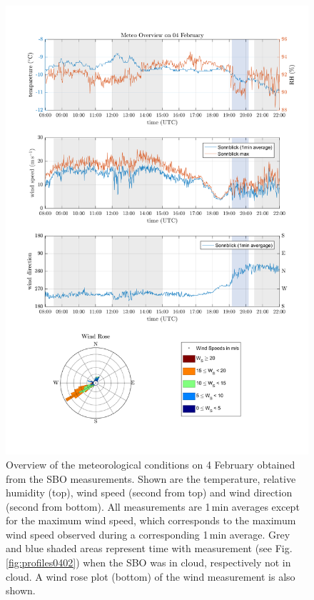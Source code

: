 \documentclass[draft,linenumbers]{agujournal}
\begin{document}
\begin{figure}[t]
 \centering
 	\includegraphics[width=14cm]{MeteoOvervire_0402.png}
 \caption{Overview of the meteorological conditions on 4 February obtained from the SBO measurements. Shown are the temperature, relative humidity (top), wind speed (second from top) and wind direction (second from bottom). All measurements are 1\,\si{min} averages except for the maximum wind speed, which corresponds to the maximum wind speed observed during a corresponding 1\,\si{min} average. Grey and blue shaded areas represent time with measurement (see Fig. \ref{fig:profiles0402}) when the SBO was in cloud, respectively not in cloud. A wind rose plot (bottom) of the wind measurement is also shown. }
 \label{fig:meteo0402}
\end{figure}
\end{document}

